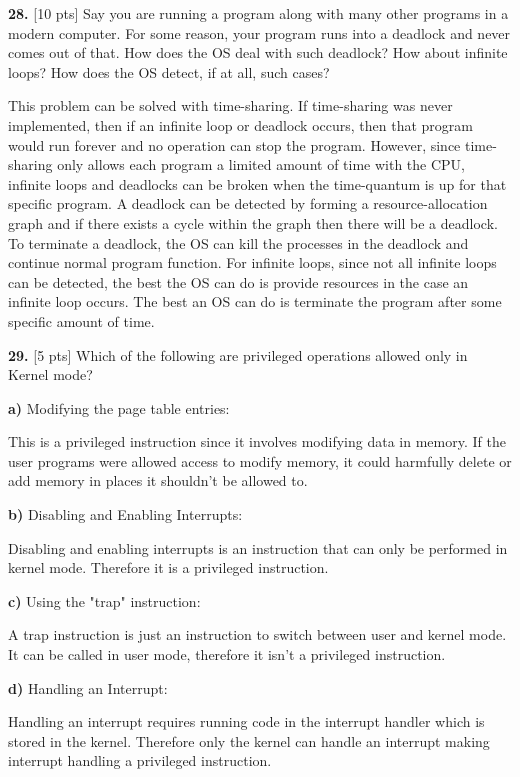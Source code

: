 \documentclass[12pt]{article}
\begin{document}
\bigskip

{\bf 28.} [10 pts] Say you are running a program along with many other programs in a modern computer. For some reason, your program runs into a deadlock and never comes out of that. How does the OS deal with such deadlock? How about infinite loops? How does the OS detect, if at all, such cases?

This problem can be solved with time-sharing. If time-sharing was never implemented, then if an infinite loop or deadlock occurs, then that program would run forever and no operation can stop the program. However, since time-sharing only allows each program a limited amount of time with the CPU, infinite loops and deadlocks can be broken when the time-quantum is up for that specific program. A deadlock can be detected by forming a resource-allocation graph and if there exists a cycle within the graph then there will be a deadlock. To terminate a deadlock, the OS can kill the processes in the deadlock and continue normal program function. For infinite loops, since not all infinite loops can be detected, the best the OS can do is provide resources in the case an infinite loop occurs. The best an OS can do is terminate the program after some specific amount of time. 

\bigskip

{\bf 29.} [5 pts] Which of the following are privileged operations allowed only in Kernel mode?

{\bf a)}	Modifying the page table entries:	

This is a privileged instruction since it involves modifying data in memory. If the user programs were allowed access to modify memory, it could harmfully delete or add memory in places it shouldn't be allowed to. 

{\bf b)} Disabling and Enabling Interrupts:

Disabling and enabling interrupts is an instruction that can only be performed in kernel mode. Therefore it is a privileged instruction. 

{\bf c)} Using the "trap" instruction:

A trap instruction is just an instruction to switch between user and kernel mode. It can be called in user mode, therefore it isn't a privileged instruction. 

{\bf d)} Handling an Interrupt:

Handling an interrupt requires running code in the interrupt handler which is stored in the kernel. Therefore only the kernel can handle an interrupt making interrupt handling a privileged instruction. 
\end{document}
